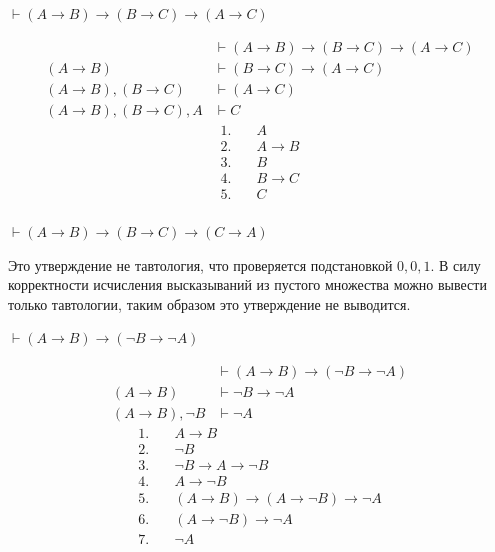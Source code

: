 \begin{exercise}[3.h]
    \(\vdash (A \to B) \to (B \to C) \to (A \to C)\)

    \begin{align*}
                                & \vdash (A \to B) \to (B \to C) \to (A \to C) \\
        (A \to B)               & \vdash (B \to C) \to (A \to C)               \\
        (A \to B), (B \to C)    & \vdash (A \to C)                             \\
        (A \to B), (B \to C), A & \vdash C
    \end{align*}
    \begin{align*}
        1.\quad & A \tag{\(\in \Gamma\)}       \\
        2.\quad & A \to B \tag{\(\in \Gamma\)} \\
        3.\quad & B \tag{M.P. 1,2}             \\
        4.\quad & B \to C \tag{\(\in\Gamma\)}  \\
        5.\quad & C \tag{M.P. 3,4}             \\
    \end{align*}
\end{exercise}

\begin{exercise}[3.i]
    \(\vdash (A \to B) \to (B \to C) \to (C \to A)\)

    Это утверждение не тавтология, что проверяется подстановкой \(0,0,1\). В силу корректности исчисления высказываний из пустого множества можно вывести только тавтологии, таким образом это утверждение не выводится.
\end{exercise}

\begin{exercise}[3.j]
    \(\vdash (A \to B) \to (\neg B \to \neg A)\)

    \begin{align*}
                          & \vdash (A \to B) \to (\neg B \to \neg A) \\
        (A \to B)         & \vdash \neg B \to \neg A                 \\
        (A \to B), \neg B & \vdash \neg A
    \end{align*}
    \begin{align*}
        1.\quad & A \to B \tag{\(\in\Gamma\)}                        \\
        2.\quad & \neg B \tag{\(\in\Gamma\)}                         \\
        3.\quad & \neg B \to A \to \neg B \tag{a. 1}                 \\
        4.\quad & A \to \neg B \tag{M.P. 2,3}                        \\
        5.\quad & (A \to B) \to (A \to \neg B) \to \neg A \tag{a. 9} \\
        6.\quad & (A \to \neg B) \to \neg A \tag{M.P. 1,5}           \\
        7.\quad & \neg A \tag{M.P. 4,6}                              \\
    \end{align*}
\end{exercise}

